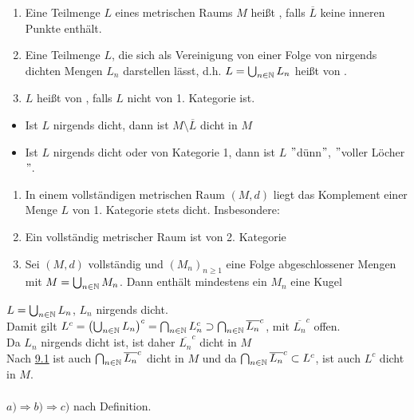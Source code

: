 \begin{definition} \label{def:9.2}
	\begin{enumerate}[label=\alph*\upshape)]
		\label{def:9.2a}
		\item Eine Teilmenge $L$ eines metrischen Raums $M$ hei{\ss}t , falls $\overline{L}$ keine inneren Punkte enthält.
		\label{def:9.2b}
		\item Eine Teilmenge $L$, die sich als Vereinigung von einer Folge von nirgends dichten Mengen $L_{n}$ darstellen lässt, d.h. $L = \bigcup_{n \in \mathbb{N}} L_{n}$ hei{\ss}t von .
		\label{def:9.2c}
		\item $L$ hei{\ss}t von , falls $L$ nicht von 1. Kategorie ist.
	\end{enumerate}
\end{definition}


\begin{bemerkung*}
	\begin{itemize}
		\item Ist $L$ nirgends dicht, dann ist $M \setminus \overline{L}$ dicht in $M$
		\item Ist $L$ nirgends dicht oder von Kategorie 1, dann ist $L$ $"$dünn$"$, $"$voller Löcher$"$.
	\end{itemize}	
\end{bemerkung*}


\begin{kor} \label{kor:9.3-KategoriensatzVonBaire}
	\begin{enumerate}[label=\alph*\upshape)]
		\item In einem vollständigen metrischen Raum $(M, d)$ liegt das Komplement einer Menge $L$ von 1. Kategorie stets dicht. Insbesondere:
		\item Ein vollständig metrischer Raum ist von 2. Kategorie
		\item Sei $(M, d)$ vollständig und $(M_{n})_{n \geq 1}$ eine Folge abgeschlossener Mengen mit $M = \bigcup_{n \in \mathbb{N}} M_{n}$. Dann enthält mindestens ein $M_{n}$ eine Kugel
	\end{enumerate}	
\end{kor}

\begin{beweis}
	$L = \bigcup_{n \in \mathbb{N}} L_{n}$, $L_{n}$ nirgends dicht. \\
	Damit gilt $L^{c} = \left( \bigcup_{n \in \mathbb{N}} L_{n} \right)^{c} = \bigcap_{n \in \mathbb{N}} L_{n}^{c} \supset \bigcap_{n \in \mathbb{N}} \overline{L_{n}}^{c}$, mit $\overline{L_{n}}^{c}$ offen. \\
	Da $L_{n}$ nirgends dicht ist, ist daher $\overline{L_{n}}^{c}$ dicht in $M$ \\
	Nach \hyperref[satz:9.1-baire]{9.1} ist auch $\bigcap_{n \in \mathbb{N}} \overline{L_{n}}^{c}$ dicht in $M$ und da $\bigcap_{n \in \mathbb{N}} \overline{L_{n}}^{c} \subset L^{c}$, ist auch $L^{c}$  dicht in $M$. \\ \\
	$a) \Rightarrow b) \Rightarrow c)$ nach Definition.
\end{beweis}


